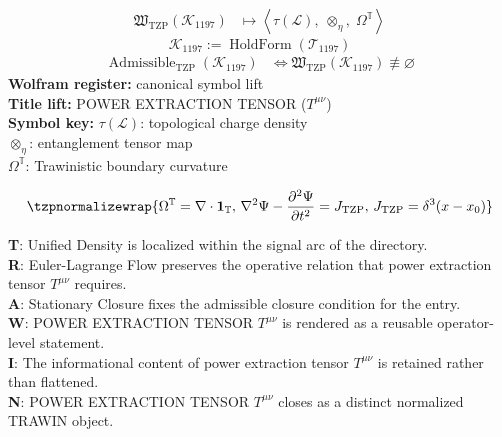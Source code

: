\noindent
\begin{minipage}[t]{0.48\linewidth}
\begingroup
\small
\[
\begin{aligned}
\mathfrak{W}_{\mathrm{TZP}}\!\left(\mathcal{K}_{1197}\right)
&\longmapsto
\left\langle \tau(\mathcal{L}),\; \otimes_{\eta},\; \Omega^{\mathbb{T}} \right\rangle
\end{aligned}
\]
\[
\mathcal{K}_{1197}
:=
\operatorname{HoldForm}\!\left(\mathcal{T}_{1197}\right)
\]
\[
\begin{aligned}
\operatorname{Admissible}_{\mathrm{TZP}}\!\left(\mathcal{K}_{1197}\right)
&\Longleftrightarrow
\mathfrak{W}_{\mathrm{TZP}}\!\left(\mathcal{K}_{1197}\right)\not\equiv\varnothing
\end{aligned}
\]
\textbf{Wolfram register:} canonical symbol lift\\
\textbf{Title lift:} POWER EXTRACTION TENSOR (\(T^{\mu\nu}\))\\
\textbf{Symbol key:} \(\tau(\mathcal{L})\): topological charge density\\ \(\otimes_{\eta}\): entanglement tensor map\\ \(\Omega^{\mathbb{T}}\): Trawinistic boundary curvature
\par
\endgroup
\end{minipage}\hfill
\begin{minipage}[t]{0.48\linewidth}
\[
\tzpnormalizewrap{\Omega^{\mathbb{T}}=\nabla\cdot\mathbf{1}_{\mathbb{T}},\,\nabla^{2}\Psi-\frac{\partial^{2}\Psi}{\partial t^{2}}=J_{\mathrm{TZP}},\,J_{\mathrm{TZP}}=\delta^{3}(x-x_{0})}
\]

\small
\textbf{T}: Unified Density is localized within the signal arc of the directory.\\
\textbf{R}: Euler-Lagrange Flow preserves the operative relation that power extraction tensor \(T^{\mu\nu}\) requires.\\
\textbf{A}: Stationary Closure fixes the admissible closure condition for the entry.\\
\textbf{W}: POWER EXTRACTION TENSOR \(T^{\mu\nu}\) is rendered as a reusable operator-level statement.\\
\textbf{I}: The informational content of power extraction tensor \(T^{\mu\nu}\) is retained rather than flattened.\\
\textbf{N}: POWER EXTRACTION TENSOR \(T^{\mu\nu}\) closes as a distinct normalized TRAWIN object.
\normalsize
\end{minipage}

